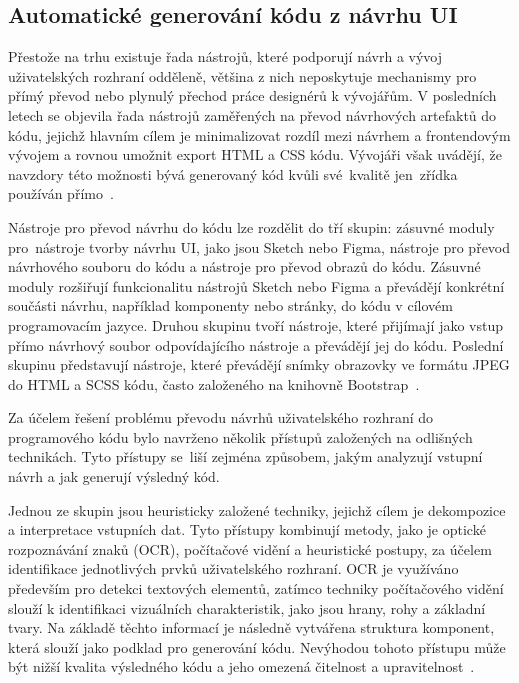 \subsection{Automatické generování kódu z návrhu UI}
\label{Autogenerate}
Přestože na trhu existuje řada nástrojů, které podporují návrh a vývoj uživatelských rozhraní odděleně, většina z nich neposkytuje mechanismy pro přímý převod nebo plynulý přechod práce designérů k vývojářům. V posledních letech se objevila řada nástrojů zaměřených na převod návrhových artefaktů do kódu, jejichž hlavním cílem je minimalizovat rozdíl mezi návrhem a frontendovým vývojem a rovnou umožnit export HTML a CSS kódu. Vývojáři však uvádějí, že navzdory této možnosti bývá generovaný kód kvůli své~kvalitě jen~zřídka používán přímo~\cite{GeneratedDesign}.

Nástroje pro převod návrhu do kódu lze rozdělit do tří skupin: zásuvné moduly pro~nástroje tvorby návrhu UI, jako jsou Sketch nebo Figma, nástroje pro převod návrhového souboru do kódu a nástroje pro převod obrazů do kódu. Zásuvné moduly rozšiřují funkcionalitu nástrojů Sketch nebo Figma a převádějí konkrétní součásti návrhu, například komponenty nebo stránky, do kódu v cílovém programovacím jazyce. Druhou skupinu tvoří nástroje, které přijímají jako vstup přímo návrhový soubor odpovídajícího nástroje a převádějí jej do kódu. Poslední skupinu představují nástroje, které převádějí snímky obrazovky ve formátu JPEG do HTML a SCSS kódu, často založeného na knihovně Bootstrap~\cite{GeneratedDesign}.

Za účelem řešení problému převodu návrhů uživatelského rozhraní do programového kódu bylo navrženo několik přístupů založených na odlišných technikách. Tyto přístupy se~liší zejména způsobem, jakým analyzují vstupní návrh a jak generují výsledný kód.

Jednou ze skupin jsou heuristicky založené techniky, jejichž cílem je dekompozice a interpretace vstupních dat. Tyto přístupy kombinují metody, jako je optické rozpoznávání znaků (OCR), počítačové vidění a heuristické postupy, za účelem identifikace jednotlivých prvků uživatelského rozhraní. OCR je využíváno především pro detekci textových elementů, zatímco techniky počítačového vidění slouží k identifikaci vizuálních charakteristik, jako jsou hrany, rohy a základní tvary. Na základě těchto informací je následně vytvářena struktura komponent, která slouží jako podklad pro generování kódu. Nevýhodou tohoto přístupu může být nižší kvalita výsledného kódu a jeho omezená čitelnost a upravitelnost~\cite{GeneratedDesign}.

